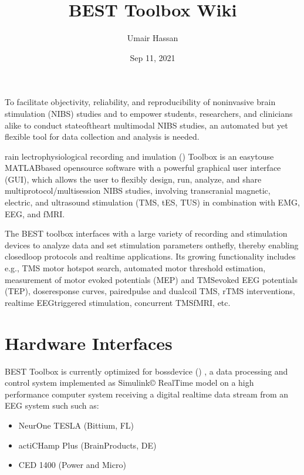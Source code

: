 \documentclass[letterpaper,10pt,english]{sphinxmanual}
\title{BEST Toolbox Wiki}
\date{Sep 11, 2021}
\author{Umair Hassan}
\begin{document}
\pagestyle{empty}
\sphinxmaketitle
\pagestyle{plain}
\sphinxtableofcontents
\pagestyle{normal}
\label{\detokenize{index::doc}}


\sphinxAtStartPar
To facilitate objectivity, reliability, and reproducibility of non\sphinxhyphen{}invasive brain stimulation (NIBS) studies and to empower students, researchers, and clinicians alike to conduct state\sphinxhyphen{}of\sphinxhyphen{}the\sphinxhyphen{}art multimodal NIBS studies, an automated but yet flexible tool for data collection and analysis is needed.

\sphinxAtStartPar
{}rain lectrophysiological recording and imulation () Toolbox is an easy\sphinxhyphen{}to\sphinxhyphen{}use MATLAB\sphinxhyphen{}based open\sphinxhyphen{}source software with a powerful graphical user interface (GUI), which allows the user to flexibly design, run, analyze, and share multi\sphinxhyphen{}protocol/multi\sphinxhyphen{}session NIBS studies, involving transcranial magnetic, electric, and ultrasound stimulation (TMS, tES, TUS) in combination with EMG, EEG, and fMRI.

\sphinxAtStartPar
The BEST toolbox interfaces with a large variety of recording and stimulation devices to analyze data and set stimulation parameters on\sphinxhyphen{}the\sphinxhyphen{}fly, thereby enabling closed\sphinxhyphen{}loop protocols and real\sphinxhyphen{}time applications. Its growing functionality includes e.g., TMS motor hotspot search, automated motor threshold estimation, measurement of motor evoked potentials (MEP) and TMS\sphinxhyphen{}evoked EEG potentials (TEP), dose\sphinxhyphen{}response curves, paired\sphinxhyphen{}pulse and dual\sphinxhyphen{}coil TMS, rTMS interventions, real\sphinxhyphen{}time EEG\sphinxhyphen{}triggered stimulation, concurrent TMS\sphinxhyphen{}fMRI, etc.


\chapter{Hardware Interfaces}
\label{\detokenize{index:hardware-interfaces}}
\sphinxAtStartPar
BEST Toolbox is currently optimized for bossdevice  () , a data processing and control system implemented as Simulink© Real\sphinxhyphen{}Time model on a high performance computer system receiving a digital real\sphinxhyphen{}time data stream from an EEG system such such as:
\begin{itemize}
\item {} 
\sphinxAtStartPar
NeurOne TESLA (Bittium, FL)

\item {} 
\sphinxAtStartPar
actiCHamp Plus (BrainProducts, DE)

\item {} 
\sphinxAtStartPar
CED 1400 (Power and Micro)

\end{itemize}
\end{document}

